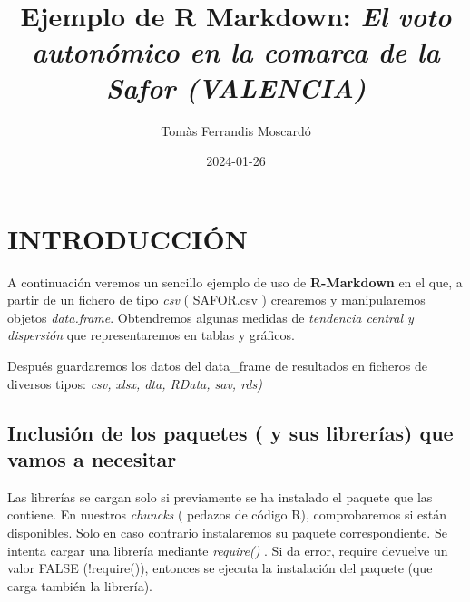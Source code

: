 \documentclass[
]{article}
\title{Ejemplo de R Markdown: \emph{El voto autonómico en la comarca de
la Safor (VALENCIA)}}
\author{Tomàs Ferrandis Moscardó}
\date{2024-01-26}
\begin{document}
\maketitle

{
\setcounter{tocdepth}{2}
\tableofcontents
}
\hypertarget{introducciuxf3n}{%
\section{INTRODUCCIÓN}\label{introducciuxf3n}}

A continuación veremos un sencillo ejemplo de uso de \textbf{R-Markdown}
en el que, a partir de un fichero de tipo \emph{csv} ( SAFOR.csv )
crearemos y manipularemos objetos \emph{data.frame}. Obtendremos algunas
medidas de \emph{tendencia central y dispersión} que representaremos en
tablas y gráficos.

Después guardaremos los datos del data\_frame de resultados en ficheros
de diversos tipos: \emph{csv, xlsx, dta, RData, sav, rds)}

\hypertarget{inclusiuxf3n-de-los-paquetes-y-sus-libreruxedas-que-vamos-a-necesitar}{%
\subsection{Inclusión de los paquetes ( y sus librerías) que vamos a
necesitar}\label{inclusiuxf3n-de-los-paquetes-y-sus-libreruxedas-que-vamos-a-necesitar}}

Las librerías se cargan solo si previamente se ha instalado el paquete
que las contiene. En nuestros \emph{chuncks} ( pedazos de código R),
comprobaremos si están disponibles. Solo en caso contrario instalaremos
su paquete correspondiente. Se intenta cargar una librería mediante
\emph{require()} . Si da error, require devuelve un valor FALSE
(!require()), entonces se ejecuta la instalación del paquete (que carga
también la librería).
\end{document}
